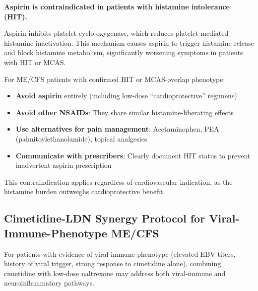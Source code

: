 \begin{warning}
\label{warn:aspirin-hit}
\textbf{Aspirin is contraindicated in patients with histamine intolerance (HIT).}

Aspirin inhibits platelet cyclo-oxygenase, which reduces platelet-mediated histamine inactivation. This mechanism causes aspirin to trigger histamine release and block histamine metabolism, significantly worsening symptoms in patients with HIT or MCAS.

For ME/CFS patients with confirmed HIT or MCAS-overlap phenotype:
\begin{itemize}
    \item \textbf{Avoid aspirin} entirely (including low-dose ``cardioprotective'' regimens)
    \item \textbf{Avoid other NSAIDs}: They share similar histamine-liberating effects
    \item \textbf{Use alternatives for pain management}: Acetaminophen, PEA (palmitoylethanolamide), topical analgesics
    \item \textbf{Communicate with prescribers}: Clearly document HIT status to prevent inadvertent aspirin prescription
\end{itemize}

This contraindication applies regardless of cardiovascular indication, as the histamine burden outweighs cardioprotective benefit.
\end{warning}

\subsection{Cimetidine-LDN Synergy Protocol for Viral-Immune-Phenotype ME/CFS}
\label{sec:cimetidine-ldn-synergy}

For patients with evidence of viral-immune phenotype (elevated EBV titers, history of viral trigger, strong response to cimetidine alone), combining cimetidine with low-dose naltrexone may address both viral-immune and neuroinflammatory pathways.

